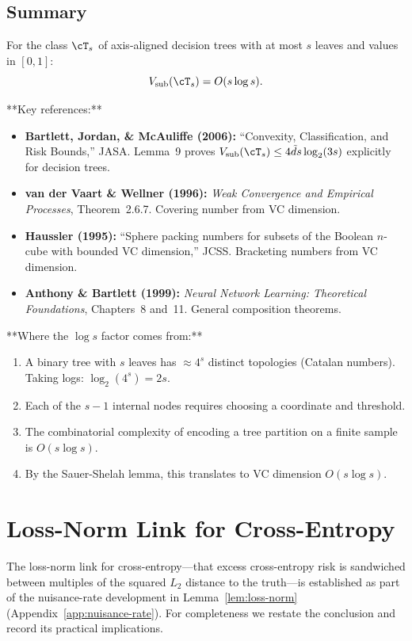 \documentclass[12pt]{article}
\begin{document}
\subsection{Summary}

For the class $\cT_s$ of axis-aligned decision trees with at most $s$ leaves and values in $[0,1]$:
\[
V_{\text{sub}}(\cT_s) = O(s \log s).
\]

**Key references:**
\begin{itemize}
\item \textbf{Bartlett, Jordan, \& McAuliffe (2006):} ``Convexity, Classification, and Risk Bounds,'' JASA. Lemma~9 proves $V_{\text{sub}}(\cT_s) \le 4\tilde{d} s \log_2(3s)$ explicitly for decision trees.
\item \textbf{van der Vaart \& Wellner (1996):} \emph{Weak Convergence and Empirical Processes}, Theorem~2.6.7. Covering number from VC dimension.
\item \textbf{Haussler (1995):} ``Sphere packing numbers for subsets of the Boolean $n$-cube with bounded VC dimension,'' JCSS. Bracketing numbers from VC dimension.
\item \textbf{Anthony \& Bartlett (1999):} \emph{Neural Network Learning: Theoretical Foundations}, Chapters~8 and~11. General composition theorems.
\end{itemize}

**Where the $\log s$ factor comes from:**
\begin{enumerate}
\item A binary tree with $s$ leaves has $\approx 4^s$ distinct topologies (Catalan numbers). Taking logs: $\log_2(4^s) = 2s$.
\item Each of the $s-1$ internal nodes requires choosing a coordinate and threshold.
\item The combinatorial complexity of encoding a tree partition on a finite sample is $O(s \log s)$.
\item By the Sauer-Shelah lemma, this translates to VC dimension $O(s \log s)$.
\end{enumerate}

\section{Loss-Norm Link for Cross-Entropy}
\label{app:loss-norm}

The loss-norm link for cross-entropy---that excess cross-entropy risk is
sandwiched between multiples of the squared $L_2$ distance to the truth---is
established as part of the nuisance-rate development in
Lemma~\ref{lem:loss-norm} (Appendix~\ref{app:nuisance-rate}). For completeness we
restate the conclusion and record its practical implications.
\end{document}
